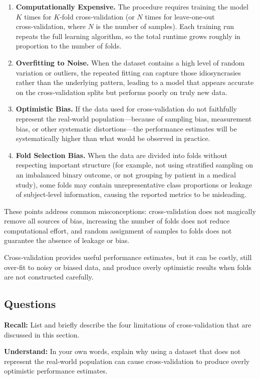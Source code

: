 \documentclass[12pt, a4paper]{article}
\begin{document}
\begin{enumerate}
  \item \textbf{Computationally Expensive.} The procedure requires training the model $K$ times for $K$‑fold cross‑validation (or $N$ times for leave‑one‑out cross‑validation, where $N$ is the number of samples). Each training run repeats the full learning algorithm, so the total runtime grows roughly in proportion to the number of folds.
  \item \textbf{Overfitting to Noise.} When the dataset contains a high level of random variation or outliers, the repeated fitting can capture those idiosyncrasies rather than the underlying pattern, leading to a model that appears accurate on the cross‑validation splits but performs poorly on truly new data.
  \item \textbf{Optimistic Bias.} If the data used for cross‑validation do not faithfully represent the real‑world population—because of sampling bias, measurement bias, or other systematic distortions—the performance estimates will be systematically higher than what would be observed in practice.
  \item \textbf{Fold Selection Bias.} When the data are divided into folds without respecting important structure (for example, not using stratified sampling on an imbalanced binary outcome, or not grouping by patient in a medical study), some folds may contain unrepresentative class proportions or leakage of subject‑level information, causing the reported metrics to be misleading.
\end{enumerate}

These points address common misconceptions: cross‑validation does not magically remove all sources of bias, increasing the number of folds does not reduce computational effort, and random assignment of samples to folds does not guarantee the absence of leakage or bias.

Cross‑validation provides useful performance estimates, but it can be costly, still over‑fit to noisy or biased data, and produce overly optimistic results when folds are not constructed carefully.

\subsection*{Questions}
\textbf{Recall:}  
List and briefly describe the four limitations of cross‑validation that are discussed in this section.

\newpage
\textbf{Understand:}  
In your own words, explain why using a dataset that does not represent the real‑world population can cause cross‑validation to produce overly optimistic performance estimates.
\end{document}
